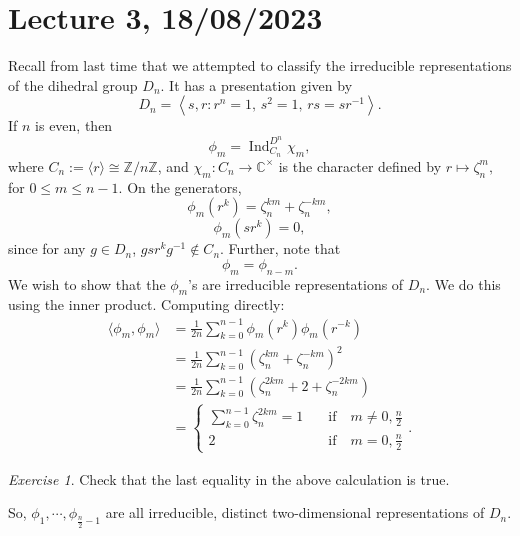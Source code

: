 \documentclass[a4paper]{report}
\theoremstyle{definition}
\theoremstyle{remark}
\theoremstyle{proposition}
\theoremstyle{conjecture}
\theoremstyle{lemma}
\theoremstyle{corollary}
\theoremstyle{exercise}
\newtheorem{exercise}{Exercise}
\theoremstyle{example}
\newcommand{\C}{\mathbb{C}}
\newcommand{\on}{\operatorname}
\begin{document}
\section{Lecture 3, 18/08/2023}

Recall from last time that we attempted to classify the irreducible 
representations of the dihedral group $D_n$. It has a presentation
given by 
$$D_n = \left\langle s,r : \text{$r^n = 1$, $s^2 = 1$, $rs=sr^{-1}$}\right\rangle.$$
If $n$ is even, then 
$$\phi_m = \on{Ind}_{C_n}^{D^n} \chi_m,$$
where $C_n := \langle r\rangle \cong \mathbb{Z}/n\mathbb{Z}$, and
$\chi_m : C_n \to\C^\times$ is the character defined by 
$r\mapsto \zeta_n^m,$ for $0\leq m \leq n-1$. On the generators, 
$$\phi_m(r^k) = \zeta_n^{km} + \zeta_n^{-km},$$
$$\phi_m(sr^k) = 0,$$
since for any $g\in D_n$, $gsr^k g^{-1} \not\in C_n$.
Further, note that 
$$\phi_{m} = \phi_{n-m}.$$
We wish to show that the $\phi_m$'s are irreducible  
representations of $D_n$.  We do this using the inner product. 
Computing directly:
\begin{align*}
    \langle \phi_m,\phi_m\rangle &= \frac{1}{2n} \sum_{k=0}^{n-1}\phi_m(r^k) \phi_m(r^{-k})\\
                                 &= \frac{1}{2n} \sum_{k=0}^{n-1} \left(\zeta_n^{km} + \zeta_n^{-km}\right)^2\\
                                 &= \frac{1}{2n} \sum_{k=0}^{n-1} \left(\zeta_n^{2km} + 2 + \zeta_n^{-2km}\right)\\
                                 &= \begin{cases}
                                     \sum_{k=0}^{n-1}\zeta_n^{2km}  = 1 \quad &\text{if}\quad m\neq 0,\frac{n}{2}\\
                                     2 \quad &\text{if}\quad m = 0, \frac{n}{2}
                                 \end{cases}.
\end{align*}
\begin{exercise}
    Check that the last equality in the above calculation is true.
\end{exercise}


So, $\phi_1,\cdots,\phi_{\frac{n}{2}-1}$ are all irreducible, distinct
two-dimensional representations of $D_n$. 
\end{document}
